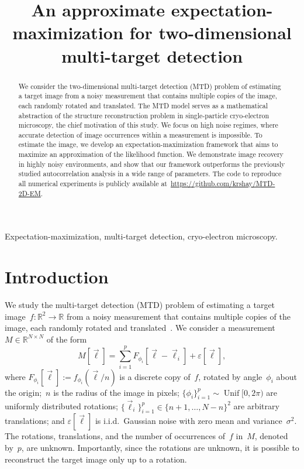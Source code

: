 \documentclass{article}
\title{An approximate expectation-maximization for two-dimensional multi-target detection}
\DeclareMathOperator{\Unif}{Unif}
\begin{document}
\ninept
%
\maketitle
%
\begin{abstract}
We consider the two-dimensional multi-target detection (MTD) problem of estimating a target image from a noisy measurement that contains multiple copies of the image, each randomly rotated and translated. The MTD model serves as a mathematical abstraction of the structure reconstruction problem in single-particle cryo-electron microscopy, the chief motivation of this study. We focus on high noise regimes, where accurate detection of image occurrences within a measurement is impossible. To estimate the image, we develop an  expectation-maximization framework that aims to maximize an approximation of the  likelihood function. We demonstrate image recovery in highly noisy environments, and show that our framework outperforms the previously studied autocorrelation analysis in a wide range of parameters. The code to reproduce all numerical experiments is publicly available at~\url{https://github.com/krshay/MTD-2D-EM}.
\end{abstract}
%
\begin{keywords}
Expectation-maximization, multi-target detection, cryo-electron microscopy.
\end{keywords}
%


\section{Introduction}
\label{sec:introduction}
We study the multi-target detection (MTD) problem of estimating a target image~\mbox{$f:\mathbb{R}^2 \rightarrow \mathbb{R}$} from a noisy measurement that contains multiple copies of the image, each randomly rotated and translated~\cite{bendory2019multi, lan2020multi, marshall2020image, bendory2021multi, kreymer2021two, shalit2021generalized, bendory2018toward}. We consider a measurement~$M \in \mathbb{R}^{N \times N}$ of the form
\begin{equation}
\label{eq:model}
M[\vec{\ell}] = \sum_{i=1}^{p} F_{\phi_i}[\vec{\ell} - \vec{\ell}_i] + \varepsilon[\vec{\ell}],
\end{equation}
where \mbox{$F_{\phi_i} [\vec{\ell}] := f_{\phi_i} (\vec{\ell} / n)$} is a discrete copy of~$f$, rotated by angle~$\phi_i$ about the origin;~$n$ is the radius of the image in pixels; \mbox{$\{\phi_i\}_{i=1}^{p} \sim \Unif[0, 2\pi)$} are uniformly distributed rotations; \mbox{$\{\vec{\ell}_i\}_{i=1}^{p} \in \{n + 1, \ldots, N-n\}^2$} are arbitrary translations;  and $\varepsilon[\vec{\ell}]$ is i.i.d.\ Gaussian noise with zero mean and \mbox{variance~$\sigma^2$}. The rotations, translations, and the number of occurrences of~$f$ in~$M$, denoted by~$p$, are unknown. Importantly, since the rotations are unknown, it is possible to reconstruct the target image only up to a rotation.
\end{document}

